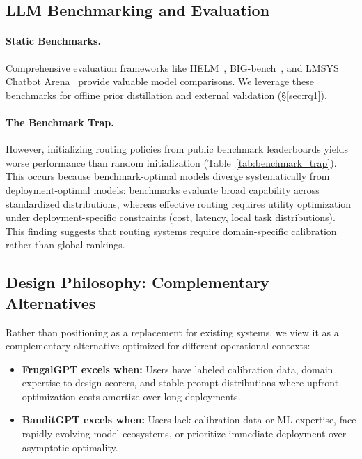 \subsection{LLM Benchmarking and Evaluation}

\paragraph{Static Benchmarks.} Comprehensive evaluation frameworks like HELM~\cite{liang2022holistic}, BIG-bench~\cite{srivastava2022beyond}, and LMSYS Chatbot Arena~\cite{zheng2023judging} provide valuable model comparisons. We leverage these benchmarks for offline prior distillation and external validation (\S\ref{sec:rq1}).

\paragraph{The Benchmark Trap.} However, initializing routing policies from public benchmark leaderboards yields worse performance than random initialization (Table~\ref{tab:benchmark_trap}). This occurs because benchmark-optimal models diverge systematically from deployment-optimal models: benchmarks evaluate broad capability across standardized distributions, whereas effective routing requires utility optimization under deployment-specific constraints (cost, latency, local task distributions). This finding suggests that routing systems require domain-specific calibration rather than global rankings.

\subsection{Design Philosophy: Complementary Alternatives}

Rather than positioning \ours{} as a replacement for existing systems, we view it as a complementary alternative optimized for different operational contexts:

\begin{itemize}[leftmargin=*,nosep]
    \item \textbf{FrugalGPT excels when:} Users have labeled calibration data, domain expertise to design scorers, and stable prompt distributions where upfront optimization costs amortize over long deployments.
    \item \textbf{BanditGPT excels when:} Users lack calibration data or ML expertise, face rapidly evolving model ecosystems, or prioritize immediate deployment over asymptotic optimality.
\end{itemize}

